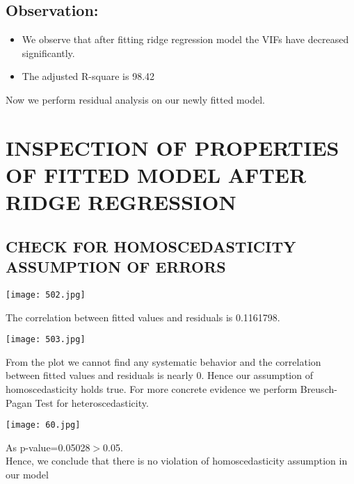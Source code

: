 \documentclass[a4paper,12pt,twoside]{book}
\begin{document}
\subsection*{Observation:}
\begin{itemize}
\item We observe that after fitting ridge regression model the VIFs have decreased significantly.\\
\item The adjusted R-square is 98.42%
\end{itemize}
Now we perform residual analysis on our newly fitted model.
\section{INSPECTION OF PROPERTIES OF FITTED MODEL AFTER RIDGE REGRESSION}
\subsection{CHECK FOR HOMOSCEDASTICITY ASSUMPTION OF ERRORS}
\begin{center}
\texttt{[image: 502.jpg]}\\
\end{center}
The correlation between fitted values and residuals is 0.1161798.
\begin{center}
\texttt{[image: 503.jpg]}\\
\end{center}
From the plot we cannot find any systematic behavior and the correlation between fitted values and residuals is nearly 0. Hence our assumption of homoscedasticity holds true. For more concrete evidence we perform Breusch-Pagan Test for heteroscedasticity.
\begin{center}
\texttt{[image: 60.jpg]}\\
\end{center}
As p-value=0.05028$>$0.05. \\
Hence, we conclude that there is no violation of homoscedasticity  assumption in our model
\end{document}
